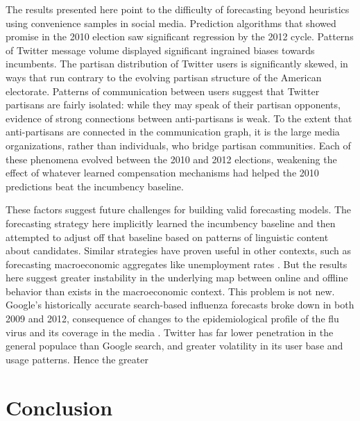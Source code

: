 \documentclass{acm_proc_article-sp}
\begin{document}
The results presented here point to the difficulty of forecasting
beyond heuristics using 
convenience samples in social media. Prediction algorithms that showed
promise in the 2010 election saw significant regression by the 2012
cycle. Patterns of Twitter message volume displayed significant
ingrained biases towards incumbents. The partisan distribution of
Twitter users is significantly skewed, in ways that run contrary to
the evolving partisan structure of the American electorate. Patterns
of communication between users suggest that Twitter partisans are
fairly isolated: while they may speak of their partisan opponents,
evidence of strong connections between anti-partisans is weak. To the
extent that anti-partisans are connected in the communication graph,
it is the large media organizations, rather than individuals, who
bridge partisan communities. Each of these phenomena evolved between
the 2010 and 2012 elections, weakening the effect of whatever learned
compensation mechanisms had helped the 2010 predictions beat the
incumbency baseline.

These factors suggest future challenges for building valid forecasting
models. The forecasting strategy here implicitly learned the
incumbency baseline and then attempted to adjust off that baseline
based on patterns of linguistic content about candidates. Similar
strategies have proven useful in other contexts, such as forecasting
macroeconomic aggregates like unemployment rates
\cite{choi2012predicting}. But the results here suggest greater
instability in the underlying map between online and offline behavior
than exists in the macroeconomic context. This problem is not
new. Google's historically accurate search-based influenza forecasts
\cite{ginsberg2008detecting} broke down in both 2009 and 2012,
consequence of changes to the epidemiological profile of the flu virus
and its coverage in the media \cite{butler2013google}. Twitter has
far lower penetration in the general populace than Google search, and
greater volatility in its user base and usage patterns. Hence the
greater 



\section{Conclusion}
\label{sec:conclusion}
\end{document}
